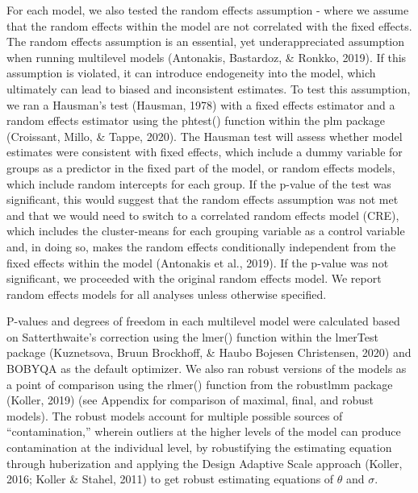\documentclass[
  english,
  man, noextraspace,floatsintext]{apa6}
\begin{document}
For each model, we also tested the random effects assumption - where we assume that the random effects within the model are not correlated with the fixed effects. The random effects assumption is an essential, yet underappreciated assumption when running multilevel models (Antonakis, Bastardoz, \& Ronkko, 2019). If this assumption is violated, it can introduce endogeneity into the model, which ultimately can lead to biased and inconsistent estimates. To test this assumption, we ran a Hausman's test (Hausman, 1978) with a fixed effects estimator and a random effects estimator using the phtest() function within the plm package (Croissant, Millo, \& Tappe, 2020). The Hausman test will assess whether model estimates were consistent with fixed effects, which include a dummy variable for groups as a predictor in the fixed part of the model, or random effects models, which include random intercepts for each group. If the p-value of the test was significant, this would suggest that the random effects assumption was not met and that we would need to switch to a correlated random effects model (CRE), which includes the cluster-means for each grouping variable as a control variable and, in doing so, makes the random effects conditionally independent from the fixed effects within the model (Antonakis et al., 2019). If the p-value was not significant, we proceeded with the original random effects model. We report random effects models for all analyses unless otherwise specified.

P-values and degrees of freedom in each multilevel model were calculated based on Satterthwaite's correction using the lmer() function within the lmerTest package (Kuznetsova, Bruun Brockhoff, \& Haubo Bojesen Christensen, 2020) and BOBYQA as the default optimizer. We also ran robust versions of the models as a point of comparison using the rlmer() function from the robustlmm package (Koller, 2019) (see Appendix for comparison of maximal, final, and robust models). The robust models account for multiple possible sources of ``contamination,'' wherein outliers at the higher levels of the model can produce contamination at the individual level, by robustifying the estimating equation through huberization and applying the Design Adaptive Scale approach (Koller, 2016; Koller \& Stahel, 2011) to get robust estimating equations of \(\theta\) and \(\sigma\).
\end{document}
